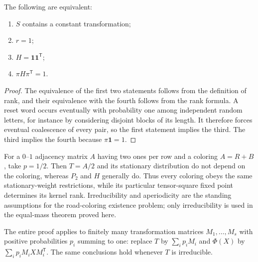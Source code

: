 \begin{corollary}[Synchronization]
The following are equivalent:
\begin{enumerate}
\item $S$ contains a constant transformation;
\item $r=1$;
\item $H=\mathbf{1}\mathbf{1}^{\mathsf{T}}$;
\item $\pi H\pi^{\mathsf{T}}=1$.
\end{enumerate}
\end{corollary}
\begin{proof}
The equivalence of the first two statements follows from the definition
of rank, and their equivalence with the fourth follows from the rank
formula. A reset word occurs eventually with probability one among
independent random letters, for instance by considering disjoint blocks
of its length. It therefore forces eventual coalescence of every pair,
so the first statement implies the third. The third implies the fourth
because $\pi\mathbf{1}=1$.
\end{proof}

\begin{remark}
For a $0$--$1$ adjacency matrix $A$ having two ones per row and a coloring
$A=R+B$, take $p=1/2$. Then $T=A/2$ and its stationary distribution do
not depend on the coloring, whereas $P_2$ and $H$ generally do.
Thus every coloring obeys the same stationary-weight restrictions,
while its particular tensor-square fixed point determines its kernel
rank. Irreducibility and aperiodicity are the standing assumptions for
the road-coloring existence problem; only irreducibility is used in the
equal-mass theorem proved here.
\end{remark}

\begin{remark}
The entire proof applies to finitely many transformation matrices
$M_1,\ldots,M_s$ with positive probabilities $p_i$ summing to one:
replace $T$ by $\sum_i p_iM_i$ and $\Phi(X)$ by
$\sum_i p_iM_iXM_i^{\mathsf{T}}$. The same conclusions hold whenever $T$
is irreducible.
\end{remark}


